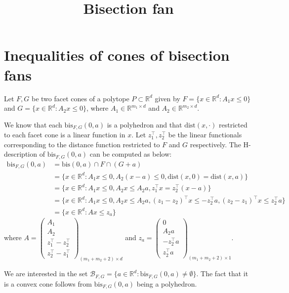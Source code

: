 \documentclass[11pt, amsfonts, reqno]{amsart}
\title{Bisection fan}
\date{}
\theoremstyle{plain}
\theoremstyle{definition}
\theoremstyle{remark}
\newcommand{\bis}{\text{bis}}
\newcommand{\dist}{\text{dist}}
\begin{document}
\section{Inequalities of cones of bisection fans}

Let $F, G$ be two facet cones of a polytope $P \subset \mathbb{R}^{d}$ given by $F = \{x \in \mathbb{R}^{d}: A_{1}x \leq 0\}$ and $G = \{x \in \mathbb{R}^{d}: A_{2}x \leq 0\}$, where $A_{1} \in \mathbb{R}^{m_{1} \times d}$ and $A_{2} \in \mathbb{R}^{m_{2} \times d}.$

We know that each $\bis_{F, G}(0, a)$ is a polyhedron and that $\dist(x, \cdot)$ restricted to each facet cone is a linear function in $x$. Let $z_{1}^{\top}, z_{2}^{\top}$ be the linear functionals corresponding to the distance function restricted to $F$ and $G$ respectively. The H-description of $\bis_{F, G}(0, a)$ can be computed as below:
\begin{align*}
\bis_{F, G}(0, a) &= \bis(0, a) \cap F \cap (G+a) \\&= \{x \in \mathbb{R}^{d}: A_{1}x \leq 0, A_{2}(x-a) \leq 0, \dist(x, 0) = \dist(x, a)\} \\&= \{x \in \mathbb{R}^{d}: A_{1}x \leq 0, A_{2}x \leq A_{2}a, z_{1}^{\top}x = z_{2}^{\top}(x-a)\} \\& = \{x \in \mathbb{R}^{d}: A_{1}x \leq 0, A_{2}x \leq A_{2}a, (z_{1}-z_{2})^{\top}x \leq  -z_{2}^{\top}a, (z_{2}-z_{1})^{\top}x \leq  z_{2}^{\top}a\} \\&= \{x \in \mathbb{R}^{d}: Ax \leq z_{a}\}
\end{align*}
where $A = \begin{pmatrix}A_{1} \\ A_{2} \\z_{1}^{\top}- z_{2}^{\top}\\ z_{2}^{\top}-z_{1}^{\top} \end{pmatrix}_{(m_{1}+m_{2}+2) \times d}$ and $z_{a} = \begin{pmatrix} 0 \\ A_{2}a \\ -z_{2}^{\top}a \\ z_{2}^{\top}a \end{pmatrix}_{(m_{1}+m_{2} +2) \times 1}.$

We are interested in the set $\mathcal{B}_{F, G} = \{a \in \mathbb{R}^{d}: \bis_{F, G}(0, a) \neq \emptyset\}$. The fact that it is a convex cone follows from $\bis_{F, G}(0, a)$ being a polyhedron. 
\end{document}
